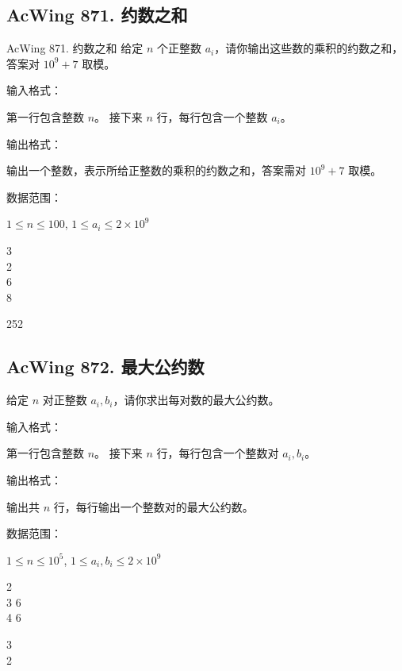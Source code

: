 \subsection{AcWing 871. 约数之和}
\begin{titledbox}{AcWing 871. 约数之和}
    给定 $n$ 个正整数 $a_i$，请你输出这些数的乘积的约数之和，答案对 $10^9+7$ 取模。

    输入格式：

    第一行包含整数 $n$。 接下来 $n$ 行，每行包含一个整数 $a_i$。

    输出格式：

    输出一个整数，表示所给正整数的乘积的约数之和，答案需对 $10^9+7$ 取模。

    数据范围：

    $1 \le n \le 100$, $1 \le a_i \le 2 \times 10^9$

    \begin{inputblock}
        3 \\
        2 \\
        6 \\
        8
    \end{inputblock}
    \begin{outputblock}
        252
    \end{outputblock}
\end{titledbox}
\subsection{AcWing 872. 最大公约数}
\begin{titledbox}
给定 $n$ 对正整数 $a_i, b_i$，请你求出每对数的最大公约数。

输入格式：

第一行包含整数 $n$。 接下来 $n$ 行，每行包含一个整数对 $a_i,b_i$。

输出格式：

输出共 $n$ 行，每行输出一个整数对的最大公约数。

数据范围：

$1 \le n \le 10^5$, $1 \le a_i, b_i \le 2 \times 10^9$

\begin{inputblock}
    2 \\
    3 6 \\
    4 6
\end{inputblock}
\begin{outputblock}
    3 \\
    2
\end{outputblock}
\end{titledbox}

